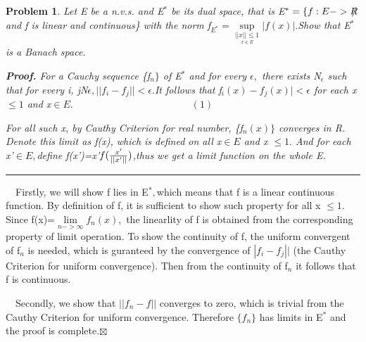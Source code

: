 \documentclass{article}
\newtheorem{problem}[theorem]{Problem}
\newenvironment{proof}[1][Proof]{\noindent\textbf{#1.} }{\ \rule{0.5em}{0.5em}}
\begin{document}
\begin{problem}
Let E be a n.v.s. and E$^{\ast }$ be its dual space, that is E$^{\ast
}=\{f:E->\NEG{R}$ and f is linear and continuous\} with the norm \TEXTsymbol{%
\vert}\TEXTsymbol{\vert}f\TEXTsymbol{\vert}\TEXTsymbol{\vert}$_{E^{\ast }}=%
\underset{\underset{x\in E}{||x||\leq 1}}{\sup }|f(x)|.$Show that E$^{\ast }$
is a Banach space.

\begin{proof}
For a Cauchy sequence \{f$_{n}\}$ of E$^{\ast }$ and for every $\epsilon ,$
there exists N$_{\epsilon }$ such that for every i, j\TEXTsymbol{>}N$%
\epsilon ,||f_{i}-f_{j}||<\epsilon .$It follows that \TEXTsymbol{\vert}f$%
_{i}(x)-f_{j}(x)|<\epsilon $ for each \TEXTsymbol{\vert}\TEXTsymbol{\vert}x%
\TEXTsymbol{\vert}\TEXTsymbol{\vert}$\leq 1$ and x$\in E.\qquad \qquad
\qquad \qquad \qquad \qquad (1)$

For all such x, by Cauthy Criterion for real number, \{f$_{n}(x)\}$
converges in R. Denote this limit as f(x), which is defined on all x$\in E$
and \TEXTsymbol{\vert}\TEXTsymbol{\vert}x\TEXTsymbol{\vert}\TEXTsymbol{\vert}%
$\leq 1.$ And for each x'$\in E,$define f(x')=\TEXTsymbol{\vert}\TEXTsymbol{%
\vert}x'\TEXTsymbol{\vert}\TEXTsymbol{\vert}$f(\frac{x^{\prime }}{%
||x^{\prime }||})$,thus we get a limit function on the whole E.
\end{proof}
\end{problem}

\ \ Firstly, we will show f lies in E$^{\ast },$which means that f is a
linear continuous function. By definition of f, it is sufficient to show
such property for all \TEXTsymbol{\vert}\TEXTsymbol{\vert}x\TEXTsymbol{\vert}%
\TEXTsymbol{\vert}$\leq 1.$Since f(x)=$\underset{n->\infty }{\lim }f_{n}(x),$
the linearlity of f is obtained from the corresponding property of limit
operation. To show the continuity of f, the uniform convergent of f$_{n}$ is
needed, which is guranteed by the convergence of \TEXTsymbol{\vert}$%
\left\vert f_{i}-f_{j}\right\vert |$ (the Cauthy Criterion for uniform
convergence). Then from the continuity of f$_{n}$ it follows that f is
continuous. 

\ \ Secondly, we show that $||f_{n}-f||$ converges to zero, which is trivial
from the Cauthy Criterion for uniform convergence. Therefore $\{f_{n}\}$ has
limits in E$^{\ast }$ and the proof is complete.$\boxtimes $
\end{document}
